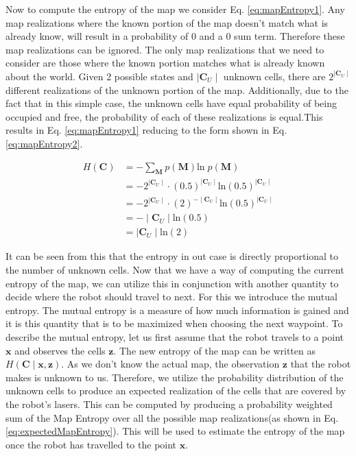 \documentclass[a4paper,12pt]{article}
\begin{document}
			Now to compute the entropy of the map we consider Eq. \ref{eq:mapEntropy1}. Any map realizations where the known portion of the map doesn't match what is already know, will result in a probability of 0 and a 0 sum term. Therefore these map realizations can be ignored. The only map realizations that we need to consider are those where the known portion matches what is already known about the world. Given 2 possible states and $\mid \textbf{C}_U \mid$ unknown cells, there are $2^{\mid \textbf{C}_U \mid}$ different realizations of the unknown portion of the map. Additionally, due to the fact that in this simple case, the unknown cells have equal probability of being occupied and free, the probability of each of these realizations is equal.This results in Eq. \ref{eq:mapEntropy1} reducing to the form shown in Eq. \ref{eq:mapEntropy2}.

			\begin{equation}
				\begin{split}
					H \left(\textbf{C}\right) &= - \sum_{\textbf{M}} p\left(\textbf{M}\right)\text{ln} \; p\left(\textbf{M}\right) \\
					&= - 2^{\mid \textbf{C}_U \mid} \cdot \left(0.5\right)^{\mid \textbf{C}_U \mid} \text{ln} \left(0.5\right)^{\mid \textbf{C}_U \mid} \\
					&= - 2^{\mid \textbf{C}_U \mid} \cdot \left(2\right)^{-\mid \textbf{C}_U \mid} \text{ln} \left(0.5\right)^{\mid \textbf{C}_U \mid} \\
					&= - \mid \textbf{C}_U \mid \text{ln} \left(0.5\right) \\
					&= \mid \textbf{C}_U \mid \text{ln} \left(2\right)
				\end{split}
				\label{eq:mapEntropy2}
			\end{equation}

			It can be seen from this that the entropy in out case is directly proportional to the number of unknown cells. Now that we have a way of computing the current entropy of the map, we can utilize this in conjunction with another quantity to decide where the robot should travel to next. For this we introduce the mutual entropy. The mutual entropy is a measure of how much information is gained and it is this quantity that is to be maximized when choosing the next waypoint. To describe the mutual entropy, let us first assume that the robot travels to a point $\textbf{x}$ and observes the cells $\textbf{z}$. The new entropy of the map can be written as $H\left(\textbf{C}\mid\textbf{x},\textbf{z}\right)$. As we don't know the actual map, the observation $\textbf{z}$ that the robot makes is unknown to us. Therefore, we utilize the probability distribution of the unknown cells to produce an expected realization of the cells that are covered by the robot's lasers. This can be computed by producing a probability weighted sum of the Map Entropy over all the possible map realizations(as shown in Eq. \ref{eq:expectedMapEntropy}). This will be used to estimate the entropy of the map once the robot has travelled to the point $\textbf{x}$. 
\end{document}
